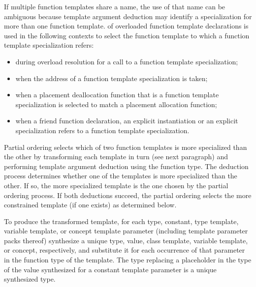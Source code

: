 \pnum
{}%
%
If multiple function templates share a name,
the use of that name can be ambiguous because
template argument deduction may identify
a specialization for more than one function template.
of overloaded function template declarations is used in the following contexts
to select the function template to which a function template specialization
refers:
\begin{itemize}
\item
during overload resolution for a call to a function template specialization;
\item
when the address of a function template specialization is taken;
\item
when a placement deallocation function that is a
function template
specialization
is selected to match a placement allocation function;
\item
when a friend function declaration, an
explicit instantiation or an explicit specialization refers to
a function template specialization.
\end{itemize}

\pnum
Partial ordering selects which of two function templates is more
specialized than the other by transforming each template in turn
(see next paragraph) and performing template argument deduction
using the function type.
The deduction process determines whether
one of the templates is more specialized than the other. If so, the
more specialized template is the one chosen by the partial ordering
process.
If both deductions succeed, the partial ordering selects
the more constrained template (if one exists) as determined below.

\pnum
To produce the transformed template, for each
type, constant,
type template, variable template, or concept
template parameter (including template parameter packs
thereof) synthesize a unique type, value, class template,
variable template, or concept,
respectively, and substitute it for each occurrence of that parameter
in the function type of the template.
The type replacing a placeholder
in the type of the value synthesized for a constant template parameter
is a unique synthesized type.

